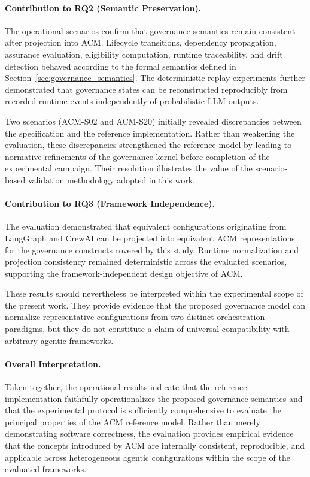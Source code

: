\documentclass[10pt]{article}
\begin{document}
\paragraph{Contribution to RQ2 (Semantic Preservation).}

The operational scenarios confirm that governance semantics remain consistent
after projection into ACM. Lifecycle transitions, dependency propagation,
assurance evaluation, eligibility computation, runtime traceability, and drift
detection behaved according to the formal semantics defined in
Section~\ref{sec:governance_semantics}. The deterministic replay experiments
further demonstrated that governance states can be reconstructed
reproducibly from recorded runtime events independently of probabilistic LLM
outputs.

Two scenarios (ACM-S02 and ACM-S20) initially revealed discrepancies between
the specification and the reference implementation. Rather than weakening the
evaluation, these discrepancies strengthened the reference model by leading to
normative refinements of the governance kernel before completion of the
experimental campaign. Their resolution illustrates the value of the
scenario-based validation methodology adopted in this work.

\paragraph{Contribution to RQ3 (Framework Independence).}

The evaluation demonstrated that equivalent configurations originating from
LangGraph and CrewAI can be projected into equivalent ACM representations for
the governance constructs covered by this study. Runtime normalization and
projection consistency remained deterministic across the evaluated scenarios,
supporting the framework-independent design objective of ACM.

These results should nevertheless be interpreted within the experimental scope
of the present work. They provide evidence that the proposed governance model
can normalize representative configurations from two distinct orchestration
paradigms, but they do not constitute a claim of universal compatibility with
arbitrary agentic frameworks.

\paragraph{Overall Interpretation.}

Taken together, the operational results indicate that the reference
implementation faithfully operationalizes the proposed governance semantics and
that the experimental protocol is sufficiently comprehensive to evaluate the
principal properties of the ACM reference model. Rather than merely
demonstrating software correctness, the evaluation provides empirical evidence
that the concepts introduced by ACM are internally consistent, reproducible,
and applicable across heterogeneous agentic configurations within the scope of
the evaluated frameworks.
\end{document}
